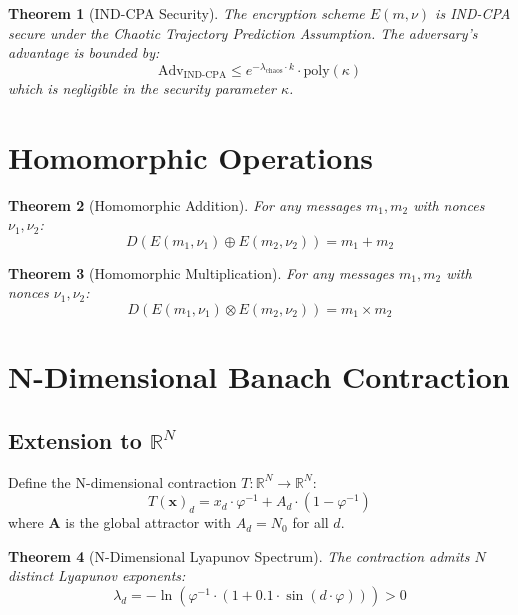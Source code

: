 \documentclass{article}
\newtheorem{theorem}{Theorem}[section]
\begin{document}
\begin{theorem}[IND-CPA Security]
The encryption scheme $E(m, \nu)$ is IND-CPA secure under the Chaotic Trajectory Prediction Assumption. The adversary's advantage is bounded by:
\begin{equation}
\text{Adv}_{\text{IND-CPA}} \leq e^{-\lambda_{\text{chaos}} \cdot k} \cdot \text{poly}(\kappa)
\end{equation}
which is negligible in the security parameter $\kappa$.
\end{theorem}

\section{Homomorphic Operations}

\begin{theorem}[Homomorphic Addition]
For any messages $m_1, m_2$ with nonces $\nu_1, \nu_2$:
\begin{equation}
D(E(m_1, \nu_1) \oplus E(m_2, \nu_2)) = m_1 + m_2
\end{equation}
\end{theorem}

\begin{theorem}[Homomorphic Multiplication]
For any messages $m_1, m_2$ with nonces $\nu_1, \nu_2$:
\begin{equation}
D(E(m_1, \nu_1) \otimes E(m_2, \nu_2)) = m_1 \times m_2
\end{equation}
\end{theorem}

\section{N-Dimensional Banach Contraction}

\subsection{Extension to $\mathbb{R}^N$}

Define the N-dimensional contraction $T: \mathbb{R}^N \to \mathbb{R}^N$:
\begin{equation}
T(\mathbf{x})_d = x_d \cdot \varphi^{-1} + A_d \cdot (1 - \varphi^{-1})
\end{equation}
where $\mathbf{A}$ is the global attractor with $A_d = N_0$ for all $d$.

\begin{theorem}[N-Dimensional Lyapunov Spectrum]
The contraction admits $N$ distinct Lyapunov exponents:
\begin{equation}
\lambda_d = -\ln\left(\varphi^{-1} \cdot (1 + 0.1 \cdot \sin(d \cdot \varphi))\right) > 0
\end{equation}
\end{theorem}
\end{document}
